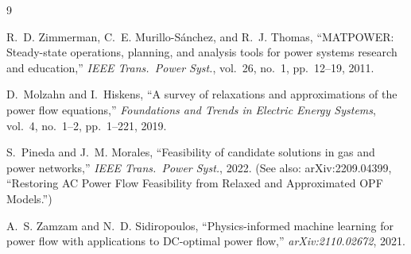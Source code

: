 \documentclass{article}
\begin{document}
\begin{thebibliography}{9}

R.~D. Zimmerman, C.~E. Murillo-S\'{a}nchez, and R.~J. Thomas,
``MATPOWER: Steady-state operations, planning, and analysis tools for
power systems research and education,''
\emph{IEEE Trans.\ Power Syst.}, vol.~26, no.~1, pp.~12--19, 2011.

D.~Molzahn and I.~Hiskens,
``A survey of relaxations and approximations of the power flow equations,''
\emph{Foundations and Trends in Electric Energy Systems}, vol.~4,
no.~1--2, pp.~1--221, 2019.

S.~Pineda and J.~M. Morales,
``Feasibility of candidate solutions in gas and power networks,''
\emph{IEEE Trans.\ Power Syst.}, 2022.
(See also: arXiv:2209.04399, ``Restoring AC Power Flow Feasibility
from Relaxed and Approximated OPF Models.'')

A.~S. Zamzam and N.~D. Sidiropoulos,
``Physics-informed machine learning for power flow with
applications to DC-optimal power flow,''
\emph{arXiv:2110.02672}, 2021.

\end{thebibliography}
\end{document}
